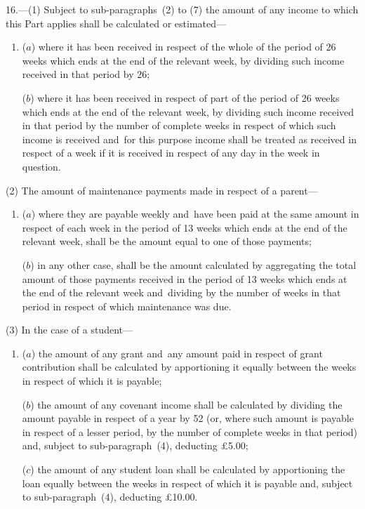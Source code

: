 \documentclass[12pt,a4paper]{article}
\begin{document}

\medskip

16.—(1) Subject to sub-paragraphs~(2) to 
(7)  %
the amount of any income to which this Part applies shall be calculated or estimated—
\begin{enumerate}\item[]
($a$) where it has been received in respect of the whole of the period of 26 weeks which ends at the end of the relevant week, by dividing such income received in that period by 26;

($b$) where it has been received in respect of part of the period of 26 weeks which ends at the end of the relevant week, by dividing such income received in that period by the number of complete weeks in respect of which such income is received and~for this purpose income shall be treated as received in respect of a week if it is received in respect of any day in the week in question.
\end{enumerate}

(2) The amount of maintenance payments made in respect of a parent—
\begin{enumerate}\item[]
($a$) where they are payable weekly and~have been paid at the same amount in respect of each week in the period of 13 weeks which ends at the end of the relevant week, shall be the amount equal to one of those payments;

($b$) in any other case, shall be the amount calculated by aggregating the total amount of those payments received in the period of 13 weeks which ends at the end of the relevant week and~dividing by the number of weeks in that period in respect of which maintenance was due.
\end{enumerate}

(3) In the case of a student—
\begin{enumerate}\item[]
($a$) the amount of any grant and~any amount paid in respect of grant contribution shall be calculated by apportioning it equally between the weeks in respect of which it is payable;

($b$) the amount of any covenant income shall be calculated by dividing the amount payable in respect of a year by 52 (or, where such amount is payable in respect of a lesser period, by the number of complete weeks in that period) and, subject to sub-paragraph~(4), deducting £5$.$00;

($c$) the amount of any student loan shall be calculated by apportioning the loan equally between the weeks in respect of which it is payable and, subject to sub-paragraph~(4), deducting £10$.$00.
\end{enumerate}
\end{document}
